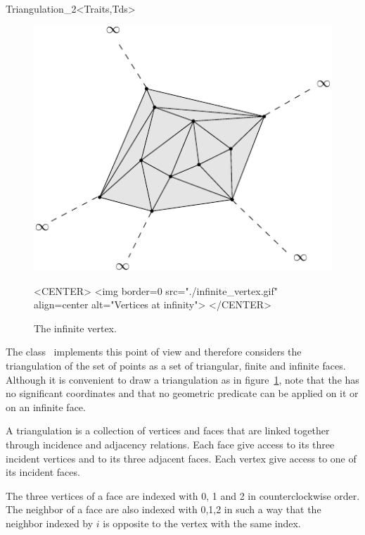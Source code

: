 \begin{ccRefClass}{Triangulation_2<Traits,Tds>}
\begin{figure}[h]
\begin{ccTexOnly}
\begin{center} \includegraphics[scale=0.5]{Triangulation_2_ref/infinite_vertex} \end{center}
\end{ccTexOnly}
\caption{The infinite vertex.
\label{Triangulation_ref_Fig_infinite_vertex}}
\begin{ccHtmlOnly}
<CENTER>
<img border=0 src="./infinite_vertex.gif" align=center alt="Vertices at
infinity">
</CENTER>
\end{ccHtmlOnly}
\end{figure}

The class \ccRefName\
implements this point of view
and therefore considers  the triangulation of the set of points 
as a set of  triangular,  finite and
infinite faces. 
Although it is convenient to draw a triangulation as in
figure~\ref{Triangulation_ref_Fig_infinite_vertex}, note that
the  has no significant
coordinates and that no geometric predicate can be applied on it
or on an infinite face.

A triangulation is a collection of vertices and faces that
are linked together through incidence and adjacency relations.
Each face give access to its three incident vertices and to
its 
three adjacent faces. Each vertex give access to one of its  incident
faces. 

The three vertices of a face are indexed with 0, 1 and 2
in counterclockwise order. The neighbor of a face are also 
indexed with 0,1,2 in such a way that the neighbor indexed by $i$
is opposite to the vertex with the same index.


\end{ccRefClass}
